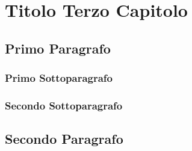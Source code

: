 \chapter{Titolo Terzo Capitolo}
\label{chap:titolocapitolo03}

\lipsum[1]

\section{Primo Paragrafo}
\lipsum[2-3]


\subsection{Primo Sottoparagrafo}
\lipsum[4-5]

\subsection{Secondo Sottoparagrafo}
\lipsum[6-7]

\section{Secondo Paragrafo}
\lipsum[1-7]
